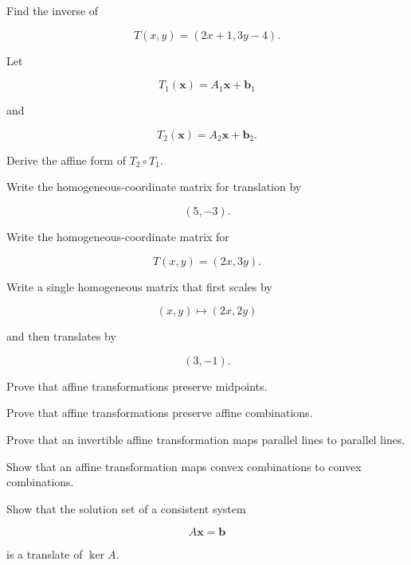 \begin{exercise}[3]
Find the inverse of

\[ T(x,y)=(2x+1,3y-4). \]
\end{exercise}

\begin{exercise}[3]
Let

\[ T_1(\mathbf{x})=A_1\mathbf{x}+\mathbf{b}_1 \]

and

\[ T_2(\mathbf{x})=A_2\mathbf{x}+\mathbf{b}_2. \]

Derive the affine form of \(T_2\circ T_1\).
\end{exercise}

\begin{exercise}[2]
Write the homogeneous-coordinate matrix for translation by

\[ (5,-3). \]
\end{exercise}

\begin{exercise}[2]
Write the homogeneous-coordinate matrix for

\[ T(x,y)=(2x,3y). \]
\end{exercise}

\begin{exercise}[3]
Write a single homogeneous matrix that first scales by

\[ (x,y)\mapsto(2x,2y) \]

and then translates by

\[ (3,-1). \]
\end{exercise}

\begin{exercise}[3]
Prove that affine transformations preserve midpoints.
\end{exercise}

\begin{exercise}[3]
Prove that affine transformations preserve affine combinations.
\end{exercise}

\begin{exercise}[3]
Prove that an invertible affine transformation maps parallel lines to
parallel lines.
\end{exercise}

\begin{exercise}[3]
Show that an affine transformation maps convex combinations to convex
combinations.
\end{exercise}

\begin{exercise}[3]
Show that the solution set of a consistent system

\[ A\mathbf{x}=\mathbf{b} \]

is a translate of \(\ker A\).
\end{exercise}

